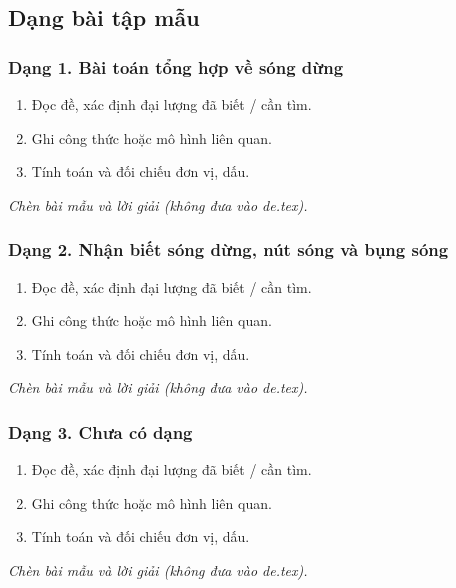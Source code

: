 

\subsection{Dạng bài tập mẫu}
\subsubsection{Dạng 1. Bài toán tổng hợp về sóng dừng}
\begin{phuongphap}
\begin{enumerate}
\item Đọc đề, xác định đại lượng đã biết / cần tìm.
\item Ghi công thức hoặc mô hình liên quan.
\item Tính toán và đối chiếu đơn vị, dấu.
\end{enumerate}
\end{phuongphap}
\begin{vidumau}
\textit{Chèn bài mẫu và lời giải (không đưa vào de.tex).}
\end{vidumau}

\subsubsection{Dạng 2. Nhận biết sóng dừng, nút sóng và bụng sóng}
\begin{phuongphap}
\begin{enumerate}
\item Đọc đề, xác định đại lượng đã biết / cần tìm.
\item Ghi công thức hoặc mô hình liên quan.
\item Tính toán và đối chiếu đơn vị, dấu.
\end{enumerate}
\end{phuongphap}
\begin{vidumau}
\textit{Chèn bài mẫu và lời giải (không đưa vào de.tex).}
\end{vidumau}

\subsubsection{Dạng 3. Chưa có dạng}
\begin{phuongphap}
\begin{enumerate}
\item Đọc đề, xác định đại lượng đã biết / cần tìm.
\item Ghi công thức hoặc mô hình liên quan.
\item Tính toán và đối chiếu đơn vị, dấu.
\end{enumerate}
\end{phuongphap}
\begin{vidumau}
\textit{Chèn bài mẫu và lời giải (không đưa vào de.tex).}
\end{vidumau}

